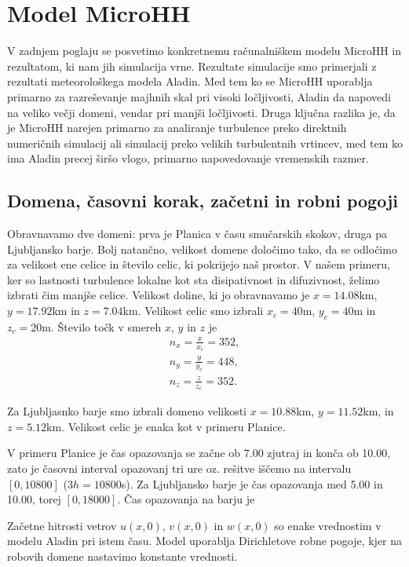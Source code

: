 \documentclass[mat2, tisk]{fmfdelo}
\begin{document}
\section{Model MicroHH}

V zadnjem poglaju se posvetimo konkretnemu računalniškem modelu 
MicroHH in rezultatom, ki nam jih simulacija vrne. Rezultate 
simulacije smo primerjali z rezultati 
meteorološkega modela Aladin. Med tem ko se MicroHH uporablja 
primarno za razreševanje majhnih skal pri visoki ločljivosti, 
Aladin da napovedi na veliko večji domeni, vendar pri manjši 
ločljivosti. Druga ključna razlika je, da je MicroHH narejen 
primarno za analiranje turbulence preko direktnih numeričnih 
simulacij ali simulacij preko velikih turbulentnih vrtincev, med tem 
ko ima Aladin precej širšo vlogo, primarno napovedovanje vremenskih 
razmer.

\subsection{Domena, časovni korak, začetni in robni pogoji}

Obravnavamo dve domeni: prva je Planica v času smučarskih skokov, druga 
pa Ljubljansko barje. Bolj natančno, velikost 
domene določimo tako, da se odločimo za velikost ene celice in 
število celic, ki pokrijejo naš prostor. V našem primeru, ker so lastnosti 
turbulence lokalne kot sta disipativnost in difuzivnost, želimo 
izbrati čim manjše celice. Velikost doline, ki jo obravnavamo je 
$x = 14.08$km, $y = 17.92$km in $z = 7.04$km. Velikost celic smo izbrali
$x_c=40$m, $y_c=40$m in $z_c=20$m. Število točk v smereh $x$, $y$ in $z$ je 
\begin{align*}
n_x = \frac{x}{x_c} = 352, \\
n_y = \frac{y}{y_c} = 448, \\
n_z = \frac{z}{z_c} = 352.
\end{align*}

Za Ljubljasnko barje smo izbrali domeno velikosti $x= 10.88$km, 
$y = 11.52$km, in $z = 5.12$km. Velikost celic je enaka kot v primeru Planice.

V primeru Planice je čas opazovanja se začne ob 7.00 zjutraj in konča ob 10.00, 
zato je časovni interval opazovanj tri ure oz. rešitve iščemo na 
intervalu $[0, 10800]$ ($3h = 10800$s). Za Ljubljansko barje je čas
opazovanja med 5.00 in 10.00, torej $[0, 18000]$.
Čas opazovanja na barju je 

Začetne hitrosti vetrov $u(x, 0)$, $v(x, 0)$ in $w(x, 0)$ so enake 
vrednostim v modelu Aladin pri istem času. 
Model uporablja Dirichletove robne pogoje, kjer na robovih domene nastavimo 
konstante vrednosti.
\end{document}
